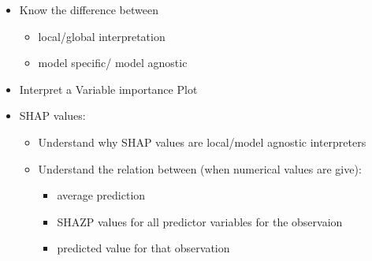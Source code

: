 \documentclass[
  letterpaper,
  DIV=11,
  numbers=noendperiod]{scrartcl}
\providecommand{\tightlist}{%
  \setlength{\itemsep}{0pt}\setlength{\parskip}{0pt}}\usepackage{longtable,booktabs,array}
\begin{document}
\begin{itemize}
\item
  Know the difference between

  \begin{itemize}
  \tightlist
  \item
    local/global interpretation
  \item
    model specific/ model agnostic
  \end{itemize}
\item
  Interpret a Variable importance Plot
\item
  SHAP values:

  \begin{itemize}
  \tightlist
  \item
    Understand why SHAP values are local/model agnostic interpreters
  \item
    Understand the relation between (when numerical values are give):

    \begin{itemize}
    \tightlist
    \item
      average prediction
    \item
      SHAZP values for all predictor variables for the observaion
    \item
      predicted value for that observation
    \end{itemize}
  \end{itemize}
\end{itemize}
\end{document}
